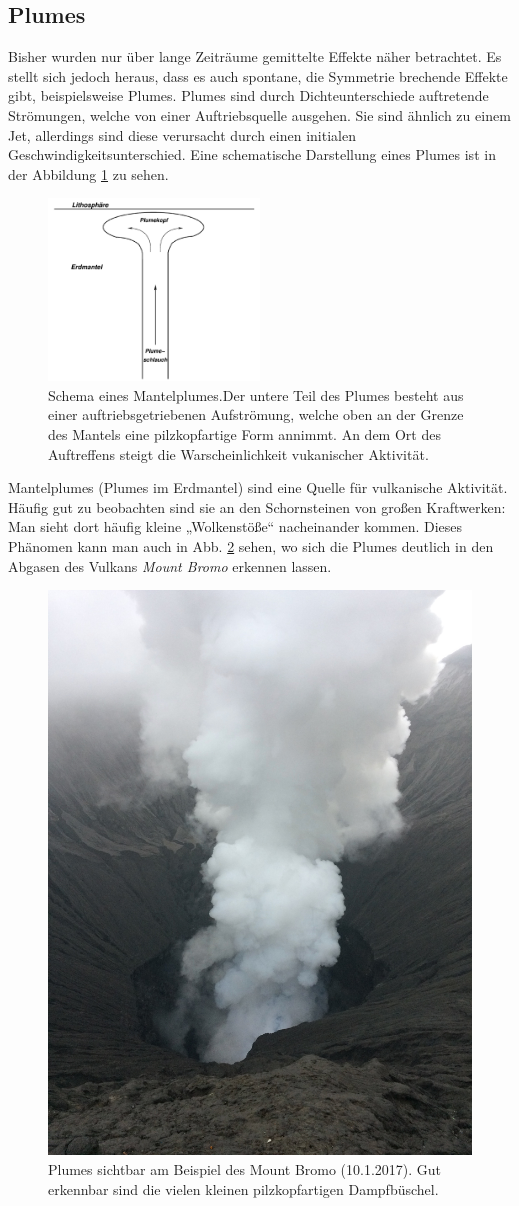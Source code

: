 \documentclass[12pt,a4paper,titlepage,headinclude]{scrartcl}
\numberwithin{equation}{subsection}
\begin{document}
\subsection{Plumes}
Bisher wurden nur über lange Zeiträume gemittelte Effekte näher betrachtet.
Es stellt sich jedoch heraus, dass es auch spontane, die Symmetrie brechende Effekte gibt, beispielsweise Plumes.
Plumes sind durch Dichteunterschiede auftretende Strömungen, welche von einer Auftriebsquelle ausgehen.
Sie sind ähnlich zu einem Jet, allerdings sind diese verursacht durch einen initialen Geschwindigkeitsunterschied.
Eine schematische Darstellung eines Plumes ist in der Abbildung \ref{fig:plume} zu sehen.
\begin{figure}[!ht]
\centering
\includegraphics[width=0.5\textwidth]{Plume}
\caption{Schema eines Mantelplumes.\protect\footnotemark Der untere Teil des Plumes besteht aus einer auftriebsgetriebenen Aufströmung, welche oben an der Grenze des Mantels eine pilzkopfartige Form annimmt. An dem Ort des Auftreffens steigt die Warscheinlichkeit vukanischer Aktivität.}
\label{fig:plume}
\end{figure}
Mantelplumes (Plumes im Erdmantel) sind eine Quelle für vulkanische Aktivität.
Häufig gut zu beobachten sind sie an den Schornsteinen von großen Kraftwerken: Man sieht dort häufig kleine „Wolkenstöße“ nacheinander kommen.
Dieses Phänomen kann man auch in Abb. \ref{fig:bromo_plumes} sehen, wo sich die Plumes deutlich in den Abgasen des Vulkans \textit{Mount Bromo} erkennen lassen.
\begin{figure}[!h]
  \centering
  \includegraphics[width=0.4\linewidth]{bromo_plumes}
  \caption{Plumes sichtbar am Beispiel des Mount Bromo (10.1.2017). Gut erkennbar sind die vielen kleinen pilzkopfartigen Dampfbüschel.}
  \label{fig:bromo_plumes}
\end{figure}
\end{document}
